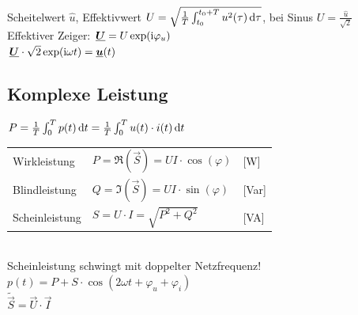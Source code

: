 \documentclass[fs, footer]{latex4ei}
\begin{document}
\begin{multicols}{4}
    Scheitelwert $\hat u$, Effektivwert $U = \sqrt{\frac{1}{T} \int_{t_0}^{t_0 + T} u^2(\tau) \diff \tau}$,
    bei Sinus $U = \frac{\hat u}{\sqrt{2}}$\\
    Effektiver Zeiger: $\underline{\boldsymbol {U}} = U \exp(\mathrm{i} \varphi_u)$\\

    $\underline{\boldsymbol {U}} \cdot \sqrt{2} \exp(\mathrm{i} \omega t) = \underline{\boldsymbol {u}}(t)$



    \subsection{Komplexe Leistung}
    $P = \frac1T \int_0^{T} p(t) \diff t = \frac1T \int_0^{T} u(t) \cdot i(t) \diff t$\\
    \begin{tabular}{lll}
        Wirkleistung   & $P = \Re(\vec S) = U I \cdot \cos(\varphi)$ & [W]   \\
        Blindleistung  & $Q = \Im(\vec S) = U I \cdot \sin(\varphi)$ & [Var] \\
        Scheinleistung & $S = U \cdot I = \sqrt{P^2 + Q^2}$          & [VA]  \\
    \end{tabular}
     \qquad
    \\

    Scheinleistung schwingt mit doppelter Netzfrequenz!
    $p(t) = P + S \cdot \cos(2\omega t + \varphi_u + \varphi_i)$\\
    $\tilde {\vec S} = \vec U \cdot \vec I$\\


\end{multicols}
\end{document}
